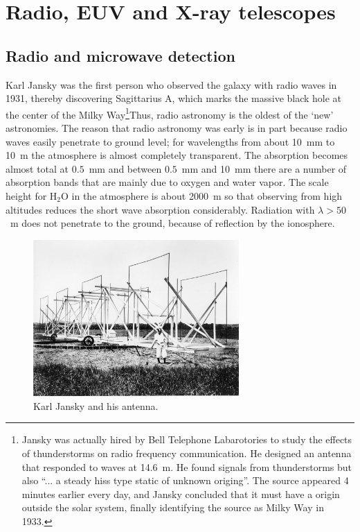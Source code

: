 \chapter{Radio, EUV and X-ray telescopes}

\section{Radio and microwave detection}

Karl Jansky was the first person who observed the galaxy with radio waves in 
1931, thereby discovering Sagittarius A, which marks the massive black hole 
at the center of the Milky Way\footnote{Jansky was actually hired by
  Bell Telephone Labarotories to study the effects of thunderstorms on
  radio frequency communication. He designed an antenna that responded
  to waves at 14.6~m. He found signals from thunderstorms but also
  ``... a steady hiss type static of unknown origing''. The source
  appeared 4 minutes earlier every day, and Jansky concluded that it
  must have a origin outside the solar system, finally identifying the
  source as Milky Way in 1933.}Thus, radio astronomy is the 
oldest of the `new' astronomies. The reason
that radio astronomy was early is in part because radio waves easily penetrate
to ground level; for wavelengths from about 10~mm to 10~m the atmosphere is
almost completely transparent. The absorption becomes almost total at 
$0.5$~mm and between $0.5$~mm and 10~mm there are a number of absorption bands
that are mainly due to oxygen and water vapor. The scale height for H$_2$O 
in the atmosphere is about 2000~m so that observing from high altitudes 
reduces the short wave absorption considerably. Radiation with $\lambda>50$~m
does not penetrate to the ground, because of reflection by the ionosphere.

\begin{figure}[h]
  \centering
	\includegraphics[width=0.7\textwidth]{jansky-antenna.eps}
  \caption{Karl Jansky and his antenna.}
  \label{fig:jansky-antenna}
\end{figure}

